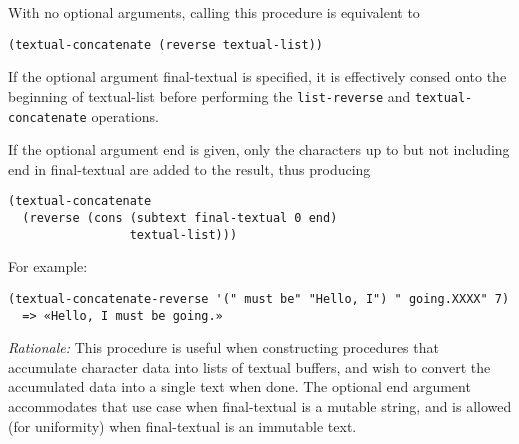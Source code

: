 \begin{entry}{%
  }

  With no optional arguments,
  calling this procedure is equivalent to

\begin{verbatim}
(textual-concatenate (reverse textual-list))
\end{verbatim}

  If the optional argument final-textual is specified, it is
  effectively consed onto the beginning of textual-list before
  performing the \texttt{list-reverse} and
  \texttt{textual-concatenate} operations.

  If the optional argument end is given, only the characters up to but
  not including end in final-textual are added to the result, thus
  producing

\begin{verbatim}
(textual-concatenate 
  (reverse (cons (subtext final-textual 0 end)
                 textual-list)))
\end{verbatim}

  For example:

\begin{verbatim}
(textual-concatenate-reverse '(" must be" "Hello, I") " going.XXXX" 7)
  => «Hello, I must be going.»
\end{verbatim}

  \emph{Rationale:} This procedure is useful when constructing
  procedures that accumulate character data into lists of textual
  buffers, and wish to convert the accumulated data into a single text
  when done. The optional end argument accommodates that use case when
  final-textual is a mutable string, and is allowed (for uniformity)
  when final-textual is an immutable text.
\end{entry}

